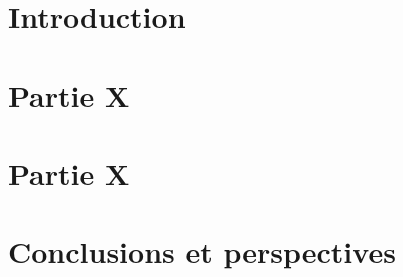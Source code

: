 \documentclass[french]{report}
\begin{document}

\clearpage

%

%

\setcounter{tocdepth}{3} %
\tableofcontents
\listoffigures
\listoftables

\newpage

%

\chapter{Introduction}


\chapter{Partie X}


\chapter{Partie X}


\chapter{Conclusions et perspectives}


\clearpage %


\clearpage
\appendix

\end{document}
